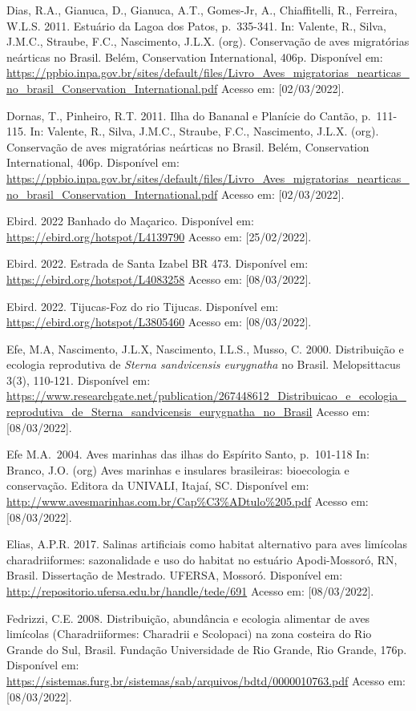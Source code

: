 \documentclass[
  oneside]{scrbook}
\begin{document}
Dias, R.A., Gianuca, D., Gianuca, A.T., Gomes-Jr, A., Chiaffitelli, R., Ferreira, W.L.S. 2011. Estuário da Lagoa dos Patos, p.~335-341. In: Valente, R., Silva, J.M.C., Straube, F.C., Nascimento, J.L.X. (org). Conservação de aves migratórias neárticas no Brasil. Belém, Conservation International, 406p. Disponível em: \url{https://ppbio.inpa.gov.br/sites/default/files/Livro_Aves_migratorias_nearticas_no_brasil_Conservation_International.pdf} Acesso em: {[}02/03/2022{]}.

Dornas, T., Pinheiro, R.T. 2011. Ilha do Bananal e Planície do Cantão, p.~111-115. In: Valente, R., Silva, J.M.C., Straube, F.C., Nascimento, J.L.X. (org). Conservação de aves migratórias neárticas no Brasil. Belém, Conservation International, 406p. Disponível em: \url{https://ppbio.inpa.gov.br/sites/default/files/Livro_Aves_migratorias_nearticas_no_brasil_Conservation_International.pdf} Acesso em: {[}02/03/2022{]}.

Ebird. 2022 Banhado do Maçarico. Disponível em: \url{https://ebird.org/hotspot/L4139790} Acesso em: {[}25/02/2022{]}.

Ebird. 2022. Estrada de Santa Izabel BR 473. Disponível em: \url{https://ebird.org/hotspot/L4083258} Acesso em: {[}08/03/2022{]}.

Ebird. 2022. Tijucas-Foz do rio Tijucas. Disponível em: \url{https://ebird.org/hotspot/L3805460} Acesso em: {[}08/03/2022{]}.

Efe, M.A, Nascimento, J.L.X, Nascimento, I.L.S., Musso, C. 2000. Distribuição e ecologia reprodutiva de \emph{Sterna sandvicensis eurygnatha} no Brasil. Melopsittacus 3(3), 110-121. Disponível em: \url{https://www.researchgate.net/publication/267448612_Distribuicao_e_ecologia_reprodutiva_de_Sterna_sandvicensis_eurygnatha_no_Brasil} Acesso em: {[}08/03/2022{]}.

Efe M.A.~2004. Aves marinhas das ilhas do Espírito Santo, p.~101-118 In: Branco, J.O. (org) Aves marinhas e insulares brasileiras: bioecologia e conservação. Editora da UNIVALI, Itajaí, SC. Disponível em: \url{http://www.avesmarinhas.com.br/Cap\%C3\%ADtulo\%205.pdf} Acesso em: {[}08/03/2022{]}.

Elias, A.P.R. 2017. Salinas artificiais como habitat alternativo para aves limícolas charadriiformes: sazonalidade e uso do habitat no estuário Apodi-Mossoró, RN, Brasil. Dissertação de Mestrado. UFERSA, Mossoró. Disponível em: \url{http://repositorio.ufersa.edu.br/handle/tede/691} Acesso em: {[}08/03/2022{]}.

Fedrizzi, C.E. 2008. Distribuição, abundância e ecologia alimentar de aves limícolas (Charadriiformes: Charadrii e Scolopaci) na zona costeira do Rio Grande do Sul, Brasil. Fundação Universidade de Rio Grande, Rio Grande, 176p. Disponível em: \url{https://sistemas.furg.br/sistemas/sab/arquivos/bdtd/0000010763.pdf} Acesso em: {[}08/03/2022{]}.
\end{document}
